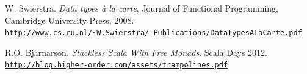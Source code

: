 \documentclass[9pt,a4paper]{article}
\newcommand{\samehref}[1]{\href{#1}{\texttt{#1}}}
\begin{document}
\begin{thebibliography}{9}
		W. Swierstra. \emph{Data types \`{a} la carte}, Journal of Functional Programming, \\ 	   
		Cambridge University Press, 2008. \\
		\href{http://www.cs.ru.nl/~W.Swierstra/Publications/DataTypesALaCarte.pdf}
			{\texttt{http://www.cs.ru.nl/{\textasciitilde}W.Swierstra/%
						Publications/DataTypesALaCarte.pdf}}
		
		R.O. Bjarnarson. \emph{Stackless Scala With Free Monads}. Scala Days 2012.\\
		\samehref{http://blog.higher-order.com/assets/trampolines.pdf}

\end{thebibliography}
\end{document}

